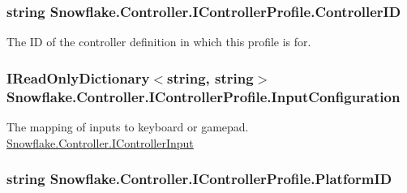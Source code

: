 \subsubsection[{Controller\+I\+D}]{\setlength{\rightskip}{0pt plus 5cm}string Snowflake.\+Controller.\+I\+Controller\+Profile.\+Controller\+I\+D\hspace{0.3cm}{\ttfamily [get]}}\label{interface_snowflake_1_1_controller_1_1_i_controller_profile_a092d06272423ca9603f422361c796991}


The I\+D of the controller definition in which this profile is for. 

\hypertarget{interface_snowflake_1_1_controller_1_1_i_controller_profile_ab4099e38a03cdd075a368d169ccbe6b4}{}
\subsubsection[{Input\+Configuration}]{\setlength{\rightskip}{0pt plus 5cm}I\+Read\+Only\+Dictionary$<$string, string$>$ Snowflake.\+Controller.\+I\+Controller\+Profile.\+Input\+Configuration\hspace{0.3cm}{\ttfamily [get]}}\label{interface_snowflake_1_1_controller_1_1_i_controller_profile_ab4099e38a03cdd075a368d169ccbe6b4}


The mapping of inputs to keyboard or gamepad. \hyperlink{interface_snowflake_1_1_controller_1_1_i_controller_input}{Snowflake.\+Controller.\+I\+Controller\+Input} 

\hypertarget{interface_snowflake_1_1_controller_1_1_i_controller_profile_a8427942ab6807a76853f9992488831ff}{}
\subsubsection[{Platform\+I\+D}]{\setlength{\rightskip}{0pt plus 5cm}string Snowflake.\+Controller.\+I\+Controller\+Profile.\+Platform\+I\+D\hspace{0.3cm}{\ttfamily [get]}}\label{interface_snowflake_1_1_controller_1_1_i_controller_profile_a8427942ab6807a76853f9992488831ff}


